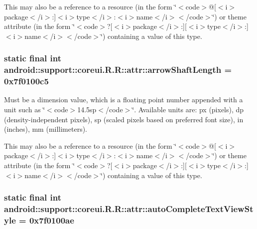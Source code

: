 This may also be a reference to a resource (in the form \char`\"{}$<$code$>$@\mbox{[}$<$i$>$package$<$/i$>$:\mbox{]}$<$i$>$type$<$/i$>$:$<$i$>$name$<$/i$>$$<$/code$>$\char`\"{}) or theme attribute (in the form \char`\"{}$<$code$>$?\mbox{[}$<$i$>$package$<$/i$>$:\mbox{]}\mbox{[}$<$i$>$type$<$/i$>$:\mbox{]}$<$i$>$name$<$/i$>$$<$/code$>$\char`\"{}) containing a value of this type. \hypertarget{classandroid_1_1support_1_1coreui_1_1_r_1_1attr_a3d5c4eb76583a57cdf9a911c48cbce0}{
\subsubsection[{arrowShaftLength}]{\setlength{\rightskip}{0pt plus 5cm}static final int android::support::coreui.R.R::attr::arrowShaftLength = 0x7f0100c5}}
\label{classandroid_1_1support_1_1coreui_1_1_r_1_1attr_a3d5c4eb76583a57cdf9a911c48cbce0}


Must be a dimension value, which is a floating point number appended with a unit such as \char`\"{}$<$code$>$14.5sp$<$/code$>$\char`\"{}. Available units are: px (pixels), dp (density-independent pixels), sp (scaled pixels based on preferred font size), in (inches), mm (millimeters). 

This may also be a reference to a resource (in the form \char`\"{}$<$code$>$@\mbox{[}$<$i$>$package$<$/i$>$:\mbox{]}$<$i$>$type$<$/i$>$:$<$i$>$name$<$/i$>$$<$/code$>$\char`\"{}) or theme attribute (in the form \char`\"{}$<$code$>$?\mbox{[}$<$i$>$package$<$/i$>$:\mbox{]}\mbox{[}$<$i$>$type$<$/i$>$:\mbox{]}$<$i$>$name$<$/i$>$$<$/code$>$\char`\"{}) containing a value of this type. \hypertarget{classandroid_1_1support_1_1coreui_1_1_r_1_1attr_7f749cab6b5769e9d9f647d18a9ed180}{
\subsubsection[{autoCompleteTextViewStyle}]{\setlength{\rightskip}{0pt plus 5cm}static final int android::support::coreui.R.R::attr::autoCompleteTextViewStyle = 0x7f0100ae}}
\label{classandroid_1_1support_1_1coreui_1_1_r_1_1attr_7f749cab6b5769e9d9f647d18a9ed180}


